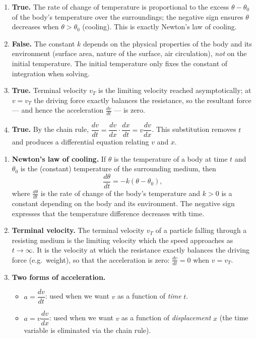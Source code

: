 \documentclass[11pt]{article}
\newcommand{\cle}[1]{{\popxbold\color{popdark}#1}}
\begin{document}
\begin{corrige}
\begin{enumerate}
\item \textbf{True.} The rate of change of temperature is proportional to the excess $\theta - \theta_0$ of the body's temperature over the surroundings; the negative sign ensures $\theta$ decreases when $\theta > \theta_0$ (cooling). This is exactly \cle{Newton's law of cooling}.

\item \textbf{False.} The constant $k$ depends on the physical properties of the body and its environment (surface area, nature of the surface, air circulation), \emph{not} on the initial temperature. The initial temperature only fixes the constant of integration when solving.

\item \textbf{True.} \cle{Terminal velocity} $v_T$ is the limiting velocity reached asymptotically; at $v = v_T$ the driving force exactly balances the resistance, so the resultant force — and hence the acceleration $\frac{dv}{dt}$ — is zero.

\item \textbf{True.} By the chain rule, $\dfrac{dv}{dt} = \dfrac{dv}{dx}\cdot\dfrac{dx}{dt} = v\dfrac{dv}{dx}$. This substitution removes $t$ and produces a differential equation relating $v$ and $x$.
\end{enumerate}
\end{corrige}

\begin{corrige}
\begin{enumerate}
\item \textbf{\cle{Newton's law of cooling}.} If $\theta$ is the temperature of a body at time $t$ and $\theta_0$ is the (constant) temperature of the surrounding medium, then
\[
\frac{d\theta}{dt} = -k(\theta - \theta_0),
\]
where $\frac{d\theta}{dt}$ is the rate of change of the body's temperature and $k > 0$ is a constant depending on the body and its environment. The negative sign expresses that the temperature difference decreases with time.

\item \textbf{\cle{Terminal velocity}.} The terminal velocity $v_T$ of a particle falling through a resisting medium is the limiting velocity which the speed approaches as $t \to \infty$. It is the velocity at which the resistance exactly balances the driving force (e.g.\ weight), so that the acceleration is zero: $\frac{dv}{dt} = 0$ when $v = v_T$.

\item \textbf{Two forms of acceleration.}
\begin{itemize}
\item $a = \dfrac{dv}{dt}$: used when we want $v$ as a function of \emph{time} $t$.
\item $a = v\dfrac{dv}{dx}$: used when we want $v$ as a function of \emph{displacement} $x$ (the time variable is eliminated via the chain rule).
\end{itemize}
\end{enumerate}
\end{corrige}
\end{document}
